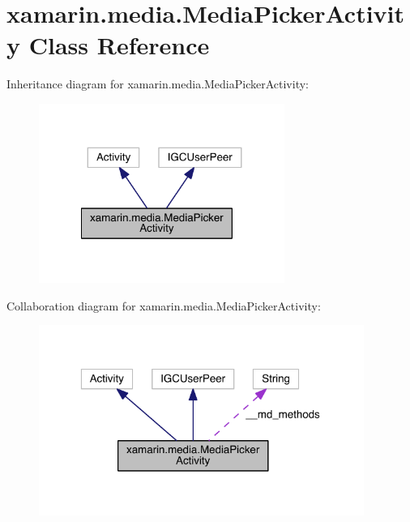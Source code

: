 \hypertarget{classxamarin_1_1media_1_1_media_picker_activity}{\section{xamarin.\+media.\+Media\+Picker\+Activity Class Reference}
\label{classxamarin_1_1media_1_1_media_picker_activity}
}


Inheritance diagram for xamarin.\+media.\+Media\+Picker\+Activity\+:
\nopagebreak
\begin{figure}[H]
\begin{center}
\leavevmode
\includegraphics[width=227pt]{classxamarin_1_1media_1_1_media_picker_activity__inherit__graph}
\end{center}
\end{figure}


Collaboration diagram for xamarin.\+media.\+Media\+Picker\+Activity\+:
\nopagebreak
\begin{figure}[H]
\begin{center}
\leavevmode
\includegraphics[width=301pt]{classxamarin_1_1media_1_1_media_picker_activity__coll__graph}
\end{center}
\end{figure}
